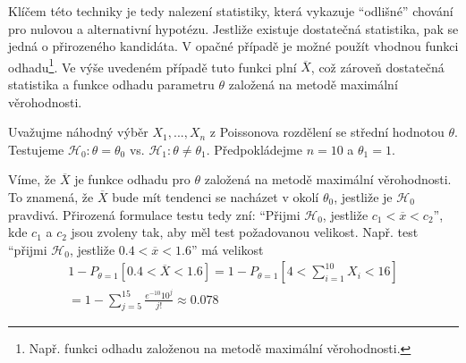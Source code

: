 Klíčem této techniky je tedy nalezení statistiky, která vykazuje ``odlišné'' chování pro nulovou a alternativní hypotézu. Jestliže existuje dostatečná statistika, pak se jedná o přirozeného kandidáta. V opačné případě je možné použít vhodnou funkci odhadu\footnote{Např. funkci odhadu založenou na metodě maximální věrohodnosti.}. Ve výše uvedeném případě tuto funkci plní $\overline{X}$, což zároveň dostatečná statistika a funkce odhadu parametru $\theta$ založená na metodě maximální věrohodnosti.

\begin{example}
Uvažujme náhodný výběr $X_1, ..., X_n$ z Poissonova rozdělení se střední hodnotou $\theta$. Testujeme $\mathscr{H}_0: \theta = \theta_0$ vs. $\mathscr{H}_1: \theta \neq \theta_1$. Předpokládejme $n = 10$ a $\theta_1 = 1$.

Víme, že $\overline{X}$ je funkce odhadu pro $\theta$ založená na metodě maximální věrohodnosti. To znamená, že $\overline{X}$ bude mít tendenci se nacházet v okolí $\theta_0$, jestliže je $\mathscr{H}_0$ pravdivá. Přirozená formulace testu tedy zní: ``Přijmi $\mathscr{H}_0$, jestliže $c_1 < \overline{x} < c_2$'', kde $c_1$ a $c_2$ jsou zvoleny tak, aby měl test požadovanou velikost. Např. test ``přijmi $\mathscr{H}_0$, jestliže $0.4 < \overline{x} < 1.6$'' má velikost
\begin{multline*}
1 - P_{\theta = 1}[0.4 < \overline{X} < 1.6] = 1 - P_{\theta = 1}[4 < \sum_{i = 1}^{10} X_i < 16]\\
= 1 - \sum_{j = 5}^{15}\frac{e^{-10}10^j}{j!} \approx 0.078
\end{multline*}
\end{example}

